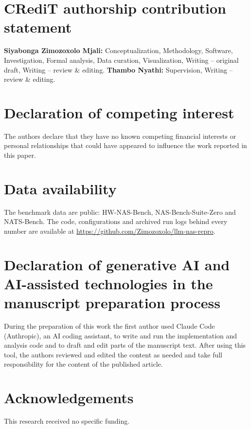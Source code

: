 \documentclass[preprint,12pt]{elsarticle}
\begin{document}
\section*{CRediT authorship contribution statement}
\textbf{Siyabonga Zimozoxolo Mjali:} Conceptualization, Methodology, Software, Investigation, Formal analysis, Data curation, Visualization, Writing -- original draft, Writing -- review \& editing. \textbf{Thambo Nyathi:} Supervision, Writing -- review \& editing.

\section*{Declaration of competing interest}
The authors declare that they have no known competing financial interests or personal relationships that could have appeared to influence the work reported in this paper.

\section*{Data availability}
The benchmark data are public: HW-NAS-Bench, NAS-Bench-Suite-Zero and NATS-Bench. The code, configurations and archived run logs behind every number are available at \url{https://github.com/Zimozoxolo/llm-nas-repro}.

\section*{Declaration of generative AI and AI-assisted technologies in the manuscript preparation process}
During the preparation of this work the first author used Claude Code (Anthropic), an AI coding assistant, to write and run the implementation and analysis code and to draft and edit parts of the manuscript text. After using this tool, the authors reviewed and edited the content as needed and take full responsibility for the content of the published article.

\section*{Acknowledgements}
This research received no specific funding.

\appendix
\end{document}
